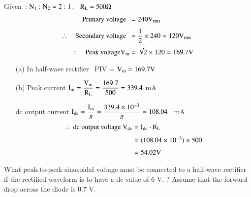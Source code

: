 \begin{solution}
Given~: $\textrm{N}_{1}:\textrm{N}_{2}=2:1$, \ $\textrm{R}_{\textrm{L}}=500\Omega$
\begin{align*}
\text{Primary voltage~ } &= 240 \textrm{V}_{\text{rms}}\\[3pt]
\therefore\quad \text{Secondary voltage~ } &= \frac{1}{2}\times 240 = 120\textrm{V}_{\text{rms}}\\[3pt]
\therefore\quad \text{Peak voltage} \textrm{V}_{\textrm{m}} &= \sqrt{2}\times 120=169.7\textrm{V} 
\end{align*}
\begin{itemize}
\item[(a)] In half-wave rectifier \ PIV = $\textrm{V}_{\textrm{m}}=169.7\textrm{V}$

\item[(b)] Peak current $\textrm{I}_{\textrm{m}}=\dfrac{\textrm{V}_{\textrm{m}}}{\textrm{R}_{\textrm{L}}}=\dfrac{169.7}{500}=339.4$ mA

dc output current $\textrm{I}_{\text{dc}}=\dfrac{\textrm{I}_{\textrm{m}}}{\pi}=\dfrac{339.4\times 10^{-3}}{\pi}=108.04$~ mA
\begin{align*}
\therefore~ \text{dc output voltage } \textrm{V}_{\text{dc}} &= \textrm{I}_{\text{dc}}\cdot \textrm{R}_{\textrm{L}}\\[3pt]
&= (108.04\times 10^{-3})\times 500\\[3pt]
&= 54.02\textrm{V}
\end{align*}
\end{itemize}
\end{solution}

\begin{problem}\label{prob1.7}
What peak-to-peak sinusoidal voltage must be connected to a half-wave rectifier if the rectified waveform is to have a dc value of 6 V. ? Assume that the forward drop across the diode is 0.7 V.
\end{problem}


